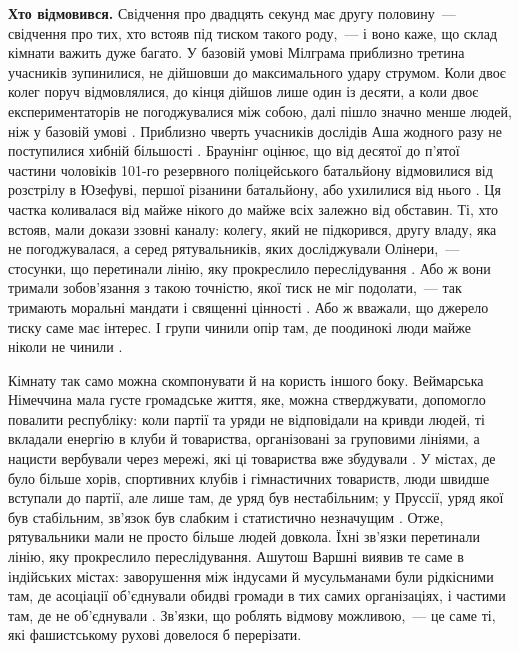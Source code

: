 \textbf{Хто відмовився.} Свідчення про двадцять секунд має другу половину~— свідчення про тих, хто встояв під тиском такого роду,~— і воно каже, що склад кімнати важить дуже багато. У базовій умові Мілграма приблизно третина учасників зупинилися, не дійшовши до максимального удару струмом. Коли двоє колег поруч відмовлялися, до кінця дійшов лише один із десяти, а коли двоє експериментаторів не погоджувалися між собою, далі пішло значно менше людей, ніж у базовій умові \autocite{milgram1974obedience}. Приблизно чверть учасників дослідів Аша жодного разу не поступилися хибній більшості \autocite{asch1956studies}. Браунінг оцінює, що від десятої до п’ятої частини чоловіків 101-го резервного поліцейського батальйону відмовилися від розстрілу в Юзефуві, першої різанини батальйону, або ухилилися від нього \autocite{browning1992ordinary}. Ця частка коливалася від майже нікого до майже всіх залежно від обставин. Ті, хто встояв, мали докази ззовні каналу: колегу, який не підкорився, другу владу, яка не погоджувалася, а серед рятувальників, яких досліджували Олінери,~— стосунки, що перетинали лінію, яку прокреслило переслідування \autocite{oliner1988altruistic}. Або ж вони тримали зобов’язання з такою точністю, якої тиск не міг подолати,~— так тримають моральні мандати і священні цінності \autocite{skitka2009limits,ginges2007sacred}. Або ж вважали, що джерело тиску саме має інтерес. І групи чинили опір там, де поодинокі люди майже ніколи не чинили \autocite{gamson1982encounters}.

Кімнату так само можна скомпонувати й на користь іншого боку. Веймарська Німеччина мала густе громадське життя, яке, можна стверджувати, допомогло повалити республіку: коли партії та уряди не відповідали на кривди людей, ті вкладали енергію в клуби й товариства, організовані за груповими лініями, а нацисти вербували через мережі, які ці товариства вже збудували \autocite{berman1997weimar}. У містах, де було більше хорів, спортивних клубів і гімнастичних товариств, люди швидше вступали до партії, але лише там, де уряд був нестабільним; у Пруссії, уряд якої був стабільним, зв’язок був слабким і статистично незначущим \autocite{satyanath2017bowling}. Отже, рятувальники мали не просто більше людей довкола. Їхні зв’язки перетинали лінію, яку прокреслило переслідування. Ашутош Варшні виявив те саме в індійських містах: заворушення між індусами й мусульманами були рідкісними там, де асоціації об’єднували обидві громади в тих самих організаціях, і частими там, де не об’єднували \autocite{varshney2002ethnic}. Зв’язки, що роблять відмову можливою,~— це саме ті, які фашистському рухові довелося б перерізати.

